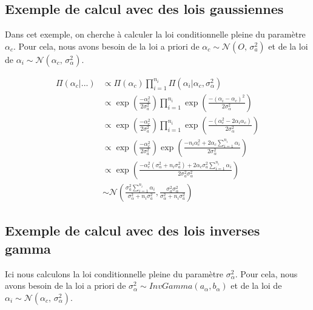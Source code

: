 \documentclass[
]{article}
\begin{document}
\hypertarget{exemple-de-calcul-avec-des-lois-gaussiennes}{%
\subsection{Exemple de calcul avec des lois
gaussiennes}\label{exemple-de-calcul-avec-des-lois-gaussiennes}}

Dans cet exemple, on cherche à calculer la loi conditionnelle pleine du
paramètre \(\alpha_c\). Pour cela, nous avons besoin de la loi a priori
de \(\alpha_{c} \sim \mathcal{N}(O,\,\sigma_{a}^{2})\) et de la loi de
\(\alpha_{i} \sim \mathcal{N}(\alpha_{c},\,\sigma_{\alpha}^{2})\).

\begin{align*}
\Pi(\alpha_{c}|...) &\propto \Pi(\alpha_{c}) \prod_{i=1}^{n_{i}} \Pi(\alpha_{i}|\alpha_{c},\sigma_{\alpha}^{2} ) \\
        &\propto \exp\left(\frac{-\alpha_{c}^{2}}{2\sigma_{a}^{2}}\right)\prod_{i=1}^{n_{i}} \exp\left(\frac{-(\alpha_{i}-\alpha_{c})^{2}}{2\sigma_{\alpha}^{2}}\right) \\
        &\propto \exp\left(\frac{-\alpha_{c}^{2}}{2\sigma_{a}^{2}}\right)\prod_{i=1}^{n_{i}} \exp\left(\frac{-(\alpha_{c}^{2}-2\alpha_{i}\alpha_{c})}{2\sigma_{\alpha}^{2}}\right) \\
        &\propto \exp\left(\frac{-\alpha_{c}^{2}}{2\sigma_{a}^{2}}\right) \exp\left(\frac{-n_i\alpha_{c}^{2}+2\alpha_{c}\sum\limits_{i=1}^{n_{i}} \alpha_{i}}{2\sigma_{\alpha}^{2}}\right)\\
        &\propto \exp\left(\frac{-\alpha_{c}^{2}(\sigma_{\alpha}^{2}+n_i\sigma_{a}^{2}) +2\alpha_{c}\sigma_{a}^{2}\sum\limits_{i=1}^{n_{i}} \alpha_{i}}{2\sigma_{a}^{2}\sigma_{\alpha}^{2}}\right)\\
        &\sim \mathcal{N}\left(\frac{\sigma_{a}^{2}\sum\limits_{i=1}^{n_{i}} \alpha_{i}}{\sigma_{\alpha}^{2}+n_{i}\sigma_{a}^{2}},\frac{\sigma_{a}^{2}\sigma_{\alpha}^{2}}{\sigma_{\alpha}^{2}+n_{i}\sigma_{a}^{2}}\right)
\end{align*}

\hypertarget{exemple-de-calcul-avec-des-lois-inverses-gamma}{%
\subsection{Exemple de calcul avec des lois inverses
gamma}\label{exemple-de-calcul-avec-des-lois-inverses-gamma}}

Ici nous calculons la loi conditionnelle pleine du paramètre
\(\sigma_{\alpha}^2\). Pour cela, nous avons besoin de la loi a priori
de \(\sigma_{\alpha}^{2} \sim InvGamma(a_{\alpha},b_{\alpha})\) et de la
loi de
\(\alpha_{i} \sim \mathcal{N}(\alpha_{c},\,\sigma_{\alpha}^{2})\).
\end{document}
